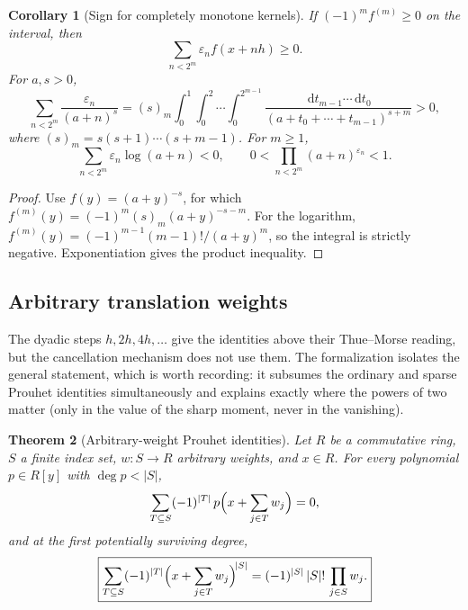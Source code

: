 \documentclass[11pt,oneside]{article}
\numberwithin{equation}{section}
\newtheorem{theorem}{Theorem}[section]
\newtheorem{corollary}[theorem]{Corollary}
\theoremstyle{definition}
\theoremstyle{remark}
\newcommand{\dd}{\,\mathrm d}
\newcommand{\eps}{\varepsilon}
\begin{document}
\begin{corollary}[Sign for completely monotone kernels]
\label{cor:complete-monotone}
If \((-1)^mf^{(m)}\ge0\) on the interval, then
\begin{equation}
  \sum_{n<2^m}\eps_nf(x+nh)\ge0.
  \label{eq:complete-monotone-sign}
\end{equation}
For \(a,s>0\),
\begin{equation}
  \boxed{
  \sum_{n<2^m}\frac{\eps_n}{(a+n)^s}
  =(s)_m
  \int_0^1\int_0^2\cdots\int_0^{2^{m-1}}
  \frac{\dd t_{m-1}\cdots\dd t_0}
       {(a+t_0+\cdots+t_{m-1})^{s+m}}>0,}
  \label{eq:reciprocal-power-positive}
\end{equation}
where \((s)_m=s(s+1)\cdots(s+m-1)\).
For \(m\ge1\),
\begin{equation}
  \sum_{n<2^m}\eps_n\log(a+n)<0,
  \qquad
  0<\prod_{n<2^m}(a+n)^{\eps_n}<1.
  \label{eq:log-product-sign}
\end{equation}
\end{corollary}

\begin{proof}
Use \(f(y)=(a+y)^{-s}\), for which
\(f^{(m)}(y)=(-1)^m(s)_m(a+y)^{-s-m}\).  For the logarithm,
\(f^{(m)}(y)=(-1)^{m-1}(m-1)!/(a+y)^m\), so the integral is strictly negative.
Exponentiation gives the product inequality.
\end{proof}

\subsection{Arbitrary translation weights}
\label{sec:arbitrary-weights}

The dyadic steps \(h,2h,4h,\dots\) give the identities above their
Thue--Morse reading, but the cancellation mechanism does not use them.  The
formalization isolates the general statement, which is worth recording: it
subsumes the ordinary and sparse Prouhet identities simultaneously and
explains exactly where the powers of two matter (only in the value of the
sharp moment, never in the vanishing).

\begin{theorem}[Arbitrary-weight Prouhet identities]
\label{thm:arbitrary-weights}
Let \(R\) be a commutative ring, \(S\) a finite index set,
\(w\colon S\to R\) arbitrary weights, and \(x\in R\).  For every
polynomial \(p\in R[y]\) with \(\deg p<|S|\),
\begin{equation}
  \sum_{T\subseteq S}(-1)^{|T|}
   \,p\Bigl(x+\sum_{j\in T}w_j\Bigr)=0,
  \label{eq:arbitrary-weight-cancel}
\end{equation}
and at the first potentially surviving degree,
\begin{equation}
  \boxed{
  \sum_{T\subseteq S}(-1)^{|T|}
   \Bigl(x+\sum_{j\in T}w_j\Bigr)^{\!|S|}
  =(-1)^{|S|}\,|S|!\,\prod_{j\in S}w_j.}
  \label{eq:arbitrary-weight-sharp}
\end{equation}
\end{theorem}
\end{document}
